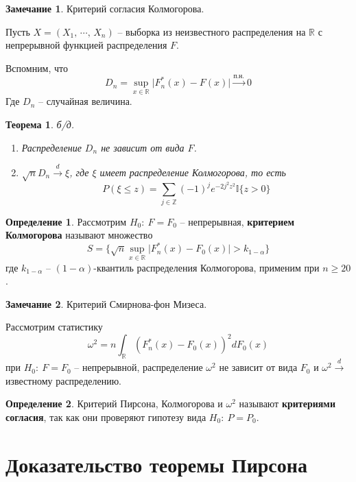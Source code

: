 \documentclass[a4paper,12pt]{article}
\renewcommand{\leq}{\ensuremath{\leqslant}}
\renewcommand{\geq}{\ensuremath{\geqslant}}
\theoremstyle{plain}
\newtheorem{theorem}{Теорема}[section]
\theoremstyle{definition}
\newtheorem{definition}{Определение}[section]
\newtheorem*{note}{Замечание}
\theoremstyle{remark}
\begin{document}
\begin{note}
  Критерий согласия Колмогорова.

  Пусть $X = (X_1,\,\cdots,\,X_n)$ -- выборка из неизвестного распределения на $\mathbb{R}$ с непрерывной функцией распределения $F$.

  Вспомним, что
  \[
    D_n = \sup_{x \in \mathbb{R}}\vert F_n^*(x) - F(x)\vert \overset{\text{п.н.}}{\to} 0
  \]
  Где $D_n$ -- случайная величина.
\end{note}

\begin{theorem}
  б/д.

  \begin{enumerate}
    \item Распределение $D_n$ не зависит от вида $F$.
    \item $\sqrt{n}D_n \overset{d}{\to} \xi$, где $\xi$ имеет распределение Колмогорова, то есть
    \[
      P(\xi \leq z) = \sum_{j \in \mathbb{Z}}(-1)^je^{-2j^2z^2}\mathbb{I}\{z > 0\}
    \]
  \end{enumerate}
\end{theorem}

\begin{definition}
  Рассмотрим $H_0 :\: F = F_0$ -- непрерывная, \textbf{критерием Колмогорова} называют множество
  \[
    S = \{\sqrt{n}\sup_{x \in \mathbb{R}}\vert F_n^*(x) - F_0(x)\vert > k_{1 - \alpha}\}
  \]
  где $k_{1 - \alpha}$ -- $(1 - \alpha)$-квантиль распределения Колмогорова, применим при $n \geq 20$.
\end{definition}

\begin{note}
  Критерий Смирнова-фон Мизеса.

  Рассмотрим статистику
  \[
    \omega^2 = n\int_\mathbb{R}(F_n^*(x) - F_0(x))^2dF_0(x)
  \]
  при $H_0 :\: F = F_0$ -- непрерывной, распределение $\omega^2$ не зависит от вида $F_0$ и $\omega^2 \overset{d}{\to} $известному распределению.
\end{note}

\begin{definition}
  Критерий Пирсона, Колмогорова и $\omega^2$ называют \textbf{критериями согласия}, так как они проверяют гипотезу вида $H_0 :\: P = P_0$.
\end{definition}

\section{Доказательство теоремы Пирсона}
\end{document}
